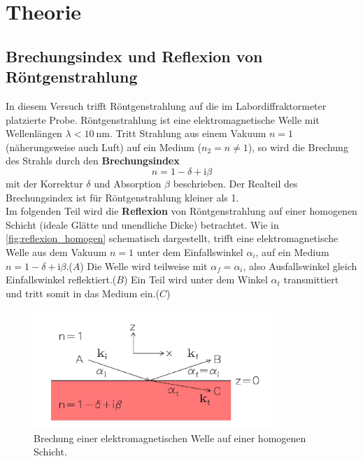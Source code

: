 \section{Theorie}
\label{sec:Theorie}
\subsection{Brechungsindex und Reflexion von Röntgenstrahlung}
In diesem Versuch trifft Röntgenstrahlung auf die im Labordiffraktormeter platzierte Probe.
Röntgenstrahlung ist eine elektromagnetische Welle mit Wellenlängen $\lambda < \SI{10}{\nano\metre}$.
Tritt Strahlung aus einem Vakuum $n = 1$ (näherungsweise auch Luft) auf ein Medium ($n_2 = n \neq 1$), so wird die Brechung des Strahls durch den \textbf{Brechungsindex}
\begin{equation}
    n = 1 - \delta + \mathrm{i} \beta
    \label{eqn:brechungsindex}
\end{equation}
mit der Korrektur $\delta$ und Absorption $\beta$ beschrieben.
Der Realteil des Brechungsindex ist für Röntgenstrahlung kleiner als 1.
\\
Im folgenden Teil wird die \textbf{Reflexion} von Röntgenstrahlung auf einer homogenen Schicht (ideale Glätte und unendliche Dicke) betrachtet.
Wie in \autoref{fig:reflexion_homogen} schematisch dargestellt, trifft eine elektromagnetische Welle aus dem Vakuum $n=1$ unter dem Einfallswinkel $\alpha_i$, auf ein Medium $n = 1 - \delta + \mathrm{i} \beta$.($A$)
Die Welle wird teilweise mit $\alpha_f = \alpha_i$, also Ausfallswinkel gleich Einfallswinkel reflektiert.($B$)
Ein Teil wird unter dem Winkel $\alpha_t$ transmittiert und tritt somit in das Medium ein.($C$)
\begin{figure}
    \centering
    \includegraphics[width=0.8\textwidth]{content/data/reflexion_homogen.jpg}
    \caption{Brechung einer elektromagnetischen Welle auf einer homogenen Schicht.\cite[4]{anleitung_alt}}
    \label{fig:reflexion_homogen}
\end{figure}
\FloatBarrier
